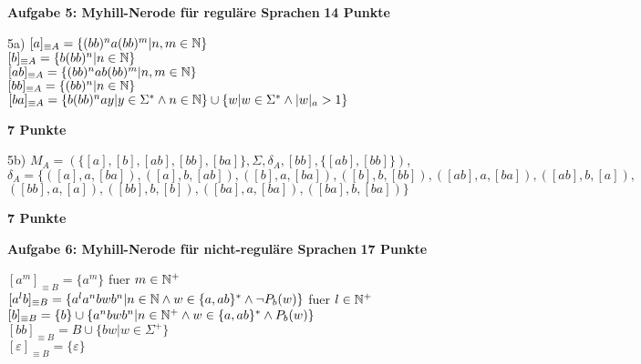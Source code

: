 \documentclass[twoside,10pt,fleqn,headinclude=false]{scrartcl}
\begin{document}
\newpage

\textbf{Aufgabe 5: Myhill-Nerode für reguläre Sprachen} \hfill \textbf{14 Punkte}
\begin{compactenum}
	\item[5a)] $[a]_{\equiv A} = \{ (bb)^na(bb)^m \vert n,m \in \mathbb{N} \}$ \\$[b]_{\equiv A} = \{ b(bb)^n \vert n \in \mathbb{N} \}$ \\$[ab]_{\equiv A} =\{(bb)^nab(bb)^m \vert n,m \in \mathbb{N} \}$ \\$[bb]_{\equiv A} =\{(bb)^n \vert n \in \mathbb{N} \}$ \\$[ba]_{\equiv A} =\{b(bb)^nay \vert y \in \Sigma^{*} \wedge n \in \mathbb{N} \} \cup \{w \vert w \in \Sigma^{*} \wedge \vert w \vert_a > 1\}$
	\item[] \hfill \textbf{7 Punkte}
	\item[5b)] $M_A=(\{[a],[b],[ab],[bb],[ba]\},\Sigma,\delta_A,[bb],\{[ab],[bb]\})$, \\ $\delta_A=\{([a],a,[ba]),([a],b,[ab]),([b],a,[ba]),([b],b,[bb]),([ab],a,[ba]),([ab],b,[a]),$\\$([bb],a,[a]),([bb],b,[b]),([ba],a,[ba]),([ba],b,[ba])\}$
	\item[] \hfill \textbf{7 Punkte}

\end{compactenum}

\newpage


\textbf{Aufgabe 6: Myhill-Nerode für nicht-reguläre Sprachen} \hfill \textbf{17 Punkte}
\begin{compactenum}
	\item[] $[a^m]_{\equiv B} = \{a^m\}$ fuer $m \in \mathbb{N}^{+}$ \\
	$[a^{l}b]_{\equiv B} = \{ a^la^nbwb^n \vert n \in \mathbb{N} \wedge w \in \{a,ab\}^{*} \wedge \neg P_{b}(w)\}$ fuer $l \in \mathbb{N}^{+}$\\
	$[b]_{\equiv B} = \{b\} \cup \{a^nbwb^n \vert n \in \mathbb{N}^{+} \wedge w \in \{a,ab\}^{*} \wedge P_{b}(w)\}$ \\
	$[bb]_{\equiv B} = B \cup \{bw \vert w \in \Sigma^{+}\}$ \\ 
	$[\varepsilon]_{\equiv B}=\{\varepsilon\}$ \\
	
\end{compactenum}

\newpage
\end{document}
